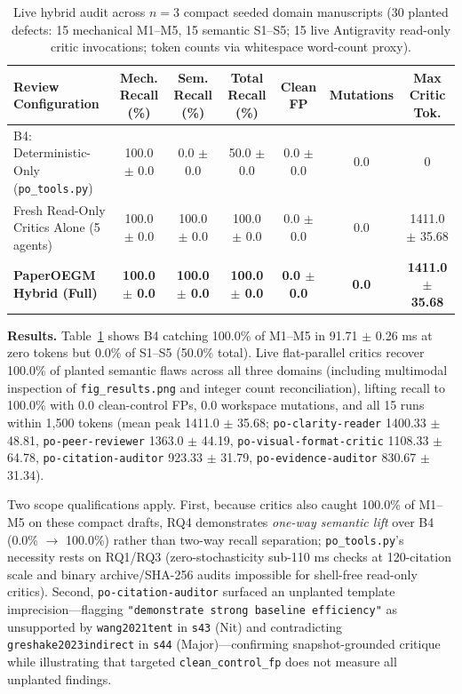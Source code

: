 \begin{table}[t]
\centering
\footnotesize
\setlength{\tabcolsep}{4pt}
\caption{Live hybrid audit across $n=3$ compact seeded domain manuscripts (30 planted defects: 15 mechanical M1--M5, 15 semantic S1--S5; 15 live Antigravity read-only critic invocations; token counts via whitespace word-count proxy).}
\label{tab:hybrid}
\begin{tabular}{lcccccc}
\toprule
\textbf{Review Configuration} & \textbf{Mech. Recall (\%)} & \textbf{Sem. Recall (\%)} & \textbf{Total Recall (\%)} & \textbf{Clean FP} & \textbf{Mutations} & \textbf{Max Critic Tok.} \\
\midrule
B4: Deterministic-Only (\texttt{po\_\allowbreak{}tools.\allowbreak{}py}) & 100.0 $\pm$ 0.0 & 0.0 $\pm$ 0.0 & 50.0 $\pm$ 0.0 & 0.0 $\pm$ 0.0 & 0.0 & 0 \\
Fresh Read-Only Critics Alone (5 agents) & 100.0 $\pm$ 0.0 & 100.0 $\pm$ 0.0 & 100.0 $\pm$ 0.0 & 0.0 $\pm$ 0.0 & 0.0 & 1411.0 $\pm$ 35.68 \\
\textbf{PaperOEGM Hybrid (Full)} & \textbf{100.0 $\pm$ 0.0} & \textbf{100.0 $\pm$ 0.0} & \textbf{100.0 $\pm$ 0.0} & \textbf{0.0 $\pm$ 0.0} & \textbf{0.0} & \textbf{1411.0 $\pm$ 35.68} \\
\bottomrule
\end{tabular}
\end{table}

\textbf{Results.} Table~\ref{tab:hybrid} shows B4 catching 100.0\% of M1--M5 in 91.71 \(\pm\) 0.26 ms at zero tokens but 0.0\% of S1--S5 (50.0\% total). Live flat-parallel critics recover 100.0\% of planted semantic flaws across all three domains (including multimodal inspection of \texttt{fig\_\allowbreak{}results.\allowbreak{}png} and integer count reconciliation), lifting recall to 100.0\% with 0.0 clean-control FPs, 0.0 workspace mutations, and all 15 runs within 1,500 tokens (mean peak 1411.0 \(\pm\) 35.68; \texttt{po-clarity-reader} 1400.33 \(\pm\) 48.81, \texttt{po-peer-reviewer} 1363.0 \(\pm\) 44.19, \texttt{po-visual-format-critic} 1108.33 \(\pm\) 64.78, \texttt{po-citation-auditor} 923.33 \(\pm\) 31.79, \texttt{po-evidence-auditor} 830.67 \(\pm\) 31.34).

Two scope qualifications apply. First, because critics also caught 100.0\% of M1--M5 on these compact drafts, RQ4 demonstrates \emph{one-way semantic lift} over B4 (0.0\% \(\to\) 100.0\%) rather than two-way recall separation; \texttt{po\_\allowbreak{}tools.\allowbreak{}py}'s necessity rests on RQ1/RQ3 (zero-stochasticity sub-110 ms checks at 120-citation scale and binary archive/SHA-256 audits impossible for shell-free read-only critics). Second, \texttt{po-citation-auditor} surfaced an unplanted template imprecision---flagging \texttt{"demonstrate\ strong\ baseline\ efficiency"} as unsupported by \texttt{wang2021tent} in \texttt{s43} (Nit) and contradicting \texttt{greshake2023indirect} in \texttt{s44} (Major)---confirming snapshot-grounded critique while illustrating that targeted \texttt{clean\_\allowbreak{}control\_\allowbreak{}fp} does not measure all unplanted findings.
